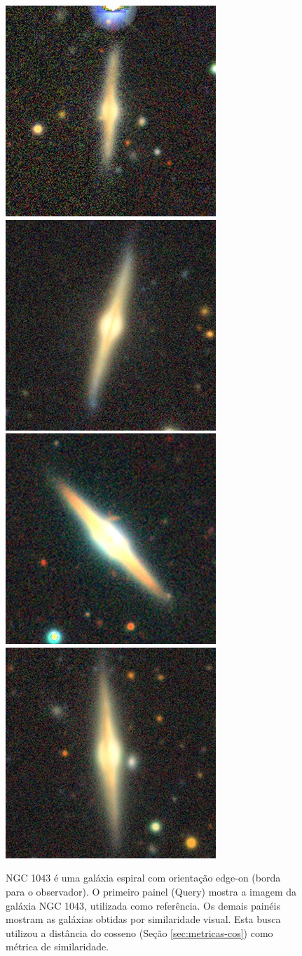 \begin{figure}[!ht]
  \includegraphics[width=0.195\linewidth]{figures/stamps/q2_26}
  \includegraphics[width=0.195\linewidth]{figures/stamps/q2_27}
  \includegraphics[width=0.195\linewidth]{figures/stamps/q2_28}
  \includegraphics[width=0.195\linewidth]{figures/stamps/q2_29}
  \caption{NGC 1043 é uma galáxia espiral com orientação edge-on (borda para o observador). O primeiro painel (Query) mostra a imagem da galáxia NGC 1043, utilizada como referência. Os demais painéis mostram as galáxias obtidas por similaridade visual. Esta busca utilizou a distância do cosseno (Seção \ref{sec:metricas-cos}) como métrica de similaridade.}
  \label{fig:q2}
\end{figure}



